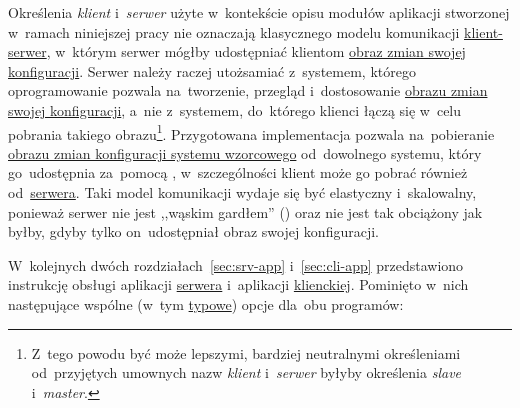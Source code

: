 \documentclass[thesis]{subfiles}
\begin{document}
Określenia \emph{klient} i~\emph{serwer} użyte w~kontekście opisu modułów aplikacji stworzonej w~ramach niniejszej pracy nie oznaczają klasycznego modelu komunikacji \href{https://en.wikipedia.org/wiki/Client\%E2\%80\%93server\_model}{klient-serwer}, w~którym serwer mógłby udostępniać klientom \hyperref[sec:obraz-zmian-konfiguracji]{obraz zmian swojej konfiguracji}. Serwer należy raczej utożsamiać z~systemem, którego oprogramowanie pozwala na~tworzenie, przegląd i~dostosowanie \hyperref[sec:obraz-zmian-konfiguracji]{obrazu zmian swojej konfiguracji}, a~nie z~systemem, do~którego klienci łączą się w~celu pobrania takiego obrazu\footnote{Z~tego powodu być może lepszymi, bardziej neutralnymi określeniami od~przyjętych umownych nazw \emph{klient} i~\emph{serwer} byłyby określenia \emph{slave} i~\emph{master}.}. Przygotowana implementacja pozwala na~pobieranie \hyperref[sec:obraz-zmian-konfiguracji]{obrazu zmian konfiguracji systemu wzorcowego} od~dowolnego systemu, który go~udostępnia za~pomocą \sftp{}, w~szczególności klient może go pobrać również od~\hyperref[sec:srv-app]{serwera}. Taki model komunikacji wydaje się być elastyczny i~skalowalny, ponieważ serwer nie jest ,,wąskim gardłem'' () oraz nie jest tak obciążony jak byłby, gdyby tylko on~udostępniał obraz swojej konfiguracji.

W~kolejnych dwóch rozdziałach~\ref{sec:srv-app} i~\ref{sec:cli-app} przedstawiono instrukcję obsługi aplikacji \hyperref[sec:srv-app]{serwera} i~aplikacji \hyperref[sec:cli-app]{klienckiej}. Pominięto w~nich następujące wspólne (w~tym \href{https://www.gnu.org/prep/standards/html_node/Command_002dLine-Interfaces.html}{typowe}) opcje dla~obu programów:
\end{document}
